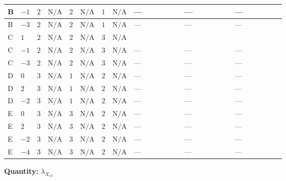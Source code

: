 \documentclass[8pt]{article}
\begin{document}
\begin{landscape}
\begin{longtable}{@{}llcccccc >{\raggedright\arraybackslash}p{0.21\linewidth} >{\raggedright\arraybackslash}p{0.21\linewidth} >{\raggedright\arraybackslash}p{0.21\linewidth}@{}}
\midrule
B & $-1$ & $2$ & $\text{N/A}$ & $2$ & $\text{N/A}$ & $1$ & $\text{N/A}$ & --- & --- & --- \\
\midrule
B & $-3$ & $2$ & $\text{N/A}$ & $2$ & $\text{N/A}$ & $1$ & $\text{N/A}$ & --- & --- & --- \\
\midrule
C & $1$ & $2$ & $\text{N/A}$ & $2$ & $\text{N/A}$ & $3$ & $\text{N/A}$ & \scriptsize\adjustbox{max width=\linewidth}{$\begin{gathered} {\lambda_{X_{15}}} (6 \operatorname{Tr}\!\left({Y_d}\,\left({Y_d}\right)^{\dagger}\right)+2 \operatorname{Tr}\!\left({Y_e}\,\left({Y_e}\right)^{\dagger}\right)+6 \operatorname{Tr}\!\left({Y_u}\,\left({Y_u}\right)^{\dagger}\right))\end{gathered}$} & \scriptsize\adjustbox{max width=\linewidth}{$\begin{gathered} -9 {g_2}^2 {\lambda_{X_{15}}}\end{gathered}$} & \scriptsize\adjustbox{max width=\linewidth}{$\begin{gathered} -3 {g_1}^2 {\lambda_{X_{15}}}\end{gathered}$} \\
\midrule
C & $-1$ & $2$ & $\text{N/A}$ & $2$ & $\text{N/A}$ & $3$ & $\text{N/A}$ & --- & --- & --- \\
\midrule
C & $-3$ & $2$ & $\text{N/A}$ & $2$ & $\text{N/A}$ & $3$ & $\text{N/A}$ & --- & --- & --- \\
\midrule
D & $0$ & $3$ & $\text{N/A}$ & $1$ & $\text{N/A}$ & $2$ & $\text{N/A}$ & --- & --- & --- \\
\midrule
D & $2$ & $3$ & $\text{N/A}$ & $1$ & $\text{N/A}$ & $2$ & $\text{N/A}$ & --- & --- & --- \\
\midrule
D & $-2$ & $3$ & $\text{N/A}$ & $1$ & $\text{N/A}$ & $2$ & $\text{N/A}$ & --- & --- & --- \\
\midrule
E & $0$ & $3$ & $\text{N/A}$ & $3$ & $\text{N/A}$ & $2$ & $\text{N/A}$ & --- & --- & --- \\
\midrule
E & $2$ & $3$ & $\text{N/A}$ & $3$ & $\text{N/A}$ & $2$ & $\text{N/A}$ & --- & --- & --- \\
\midrule
E & $-2$ & $3$ & $\text{N/A}$ & $3$ & $\text{N/A}$ & $2$ & $\text{N/A}$ & --- & --- & --- \\
\midrule
E & $-4$ & $3$ & $\text{N/A}$ & $3$ & $\text{N/A}$ & $2$ & $\text{N/A}$ & --- & --- & --- \\
\midrule
\bottomrule
\end{longtable}
\clearpage
\noindent\textbf{Quantity: }${\lambda_{X_{15}}}$\par\smallskip

\end{landscape}
\end{document}
